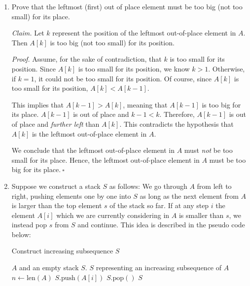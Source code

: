 \begin{enumerate}
    \item Prove that the leftmost (first) out of place element must be too big (not too small) for its place.
\begin{solution}
\textit{Claim. }Let $k$ represent the position of the leftmost out-of-place element in $A$. Then $A[k]$ is too big (not too small) for its position.

\textit{Proof. }Assume, for the sake of contradiction, that $k$ is too small for its position. Since $A[k]$ is too small for its position, we know $k>1$. Otherwise, if $k=1$, it could not be too small for its position. Of course, since $A[k]$ is too small for its position, $A[k]<A[k-1]$.

This implies that $A[k-1]>A[k]$, meaning that $A[k-1]$ is too big for its place. $A[k-1]$ is out of place and $k-1<k$. Therefore, $A[k-1]$ is out of place and \textit{further left} than $A[k]$. This contradicts the hypothesis that $A[k]$ is the leftmost out-of-place element in $A$.

We conclude that the leftmost out-of-place element in $A$ must \textit{not} be too small for its place. Hence, the leftmost out-of-place element in $A$ must be too big for its place.$~\square$
\end{solution}
\newpage
    \item Suppose we construct a stack $S$ as follows: We go through $A$ from left to right, pushing elements one by one into $S$ as long as the next element from $A$ is larger than the top element $s$ of the stack so far. If at any step $i$ the element $A[i]$ which we are currently considering in $A$ is smaller than $s$, we instead pop $s$ from $S$ and continue.
    This idea is described in the pseudo code below:
    \begin{minipage}{\linewidth}
    \begin{algorithm}[H]
    \label{incsubseq}
    \caption{Construct increasing subsequence $S$}
    \begin{algorithmic}
    \REQUIRE $A$ and an empty stack $S$.
    \ENSURE $S$ representing an increasing subsequence of $A$
    \STATE $n \leftarrow \text{len}(A)$
        \STATE $S.\text{push}(A[i])$
        \ELSE 
        \STATE $S.\text{pop}()$
        \ENDIF
    \ENDFOR
    \STATE \RETURN $S$
    \end{algorithmic}
    \end{algorithm}
    \end{minipage}
    \smallskip
    

\end{enumerate}
